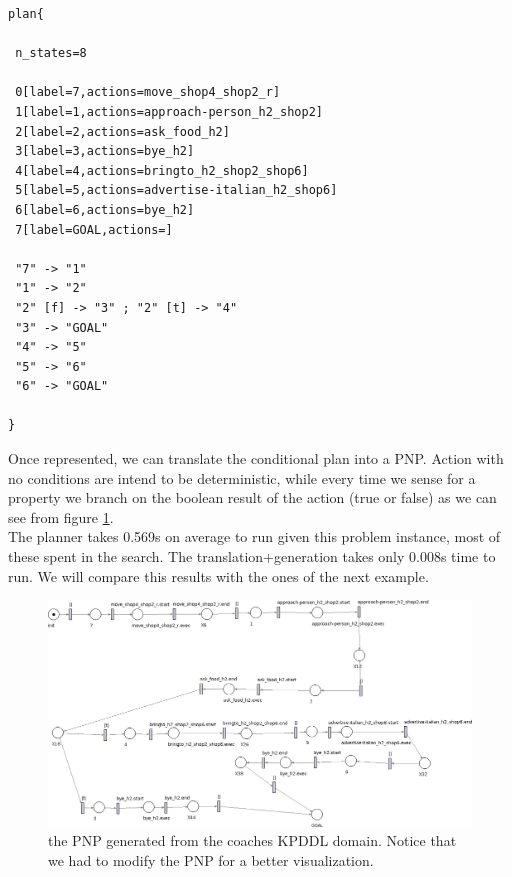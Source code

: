 \documentclass[pdftex,12pt,a4paper]{report}
\begin{document}
\begin{verbatim}
plan{ 

 n_states=8

 0[label=7,actions=move_shop4_shop2_r]
 1[label=1,actions=approach-person_h2_shop2]
 2[label=2,actions=ask_food_h2]
 3[label=3,actions=bye_h2]
 4[label=4,actions=bringto_h2_shop2_shop6]
 5[label=5,actions=advertise-italian_h2_shop6]
 6[label=6,actions=bye_h2]
 7[label=GOAL,actions=]

 "7" -> "1"
 "1" -> "2"
 "2" [f] -> "3" ; "2" [t] -> "4"
 "3" -> "GOAL"
 "4" -> "5"
 "5" -> "6"
 "6" -> "GOAL"

}
\end{verbatim}

\noindent Once represented, we can translate the conditional plan into a PNP.
Action with no conditions are intend to be deterministic, while every time we sense for a property we branch on the boolean result of the action (true or false) as we can see from figure \ref{fig:coaches_kpddlgen}.\\
The planner takes 0.569s on average to run given this problem instance, most of these spent in the search.  
The translation+generation takes only 0.008s time to run. We will compare this results with the ones of the next example.
 
\newpage
\begin{figure}[H]
	\centering
	\includegraphics[scale=0.5, angle=270, trim=50mm 0mm 0mm 50mm]{images/coaches_kpddl.png}
	\caption{the PNP generated from the coaches KPDDL domain. Notice that we had to modify the PNP for a better visualization.}
	\label{fig:coaches_kpddlgen}
\end{figure}
\newpage
\end{document}
